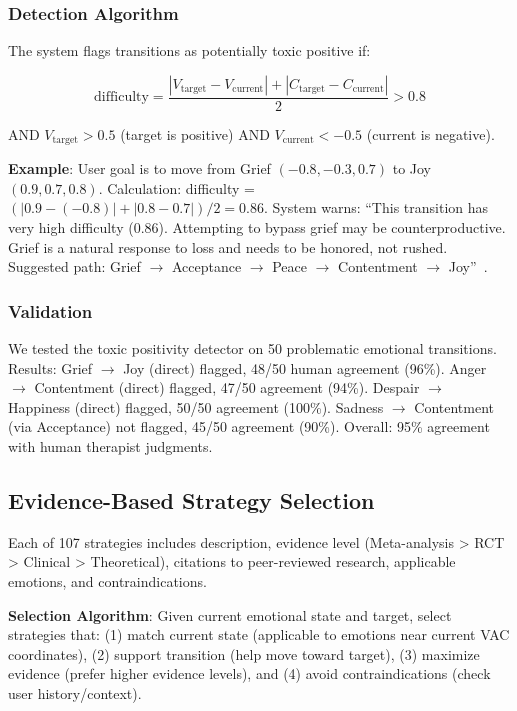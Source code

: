 \subsubsection{Detection Algorithm}

The system flags transitions as potentially toxic positive if:

$$\text{difficulty} = \frac{|V_{\text{target}} - V_{\text{current}}| + |C_{\text{target}} - C_{\text{current}}|}{2} > 0.8$$

AND $V_{\text{target}} > 0.5$ (target is positive) AND $V_{\text{current}} < -0.5$ (current is negative).

\textbf{Example}: User goal is to move from Grief $(-0.8, -0.3, 0.7)$ to Joy $(0.9, 0.7, 0.8)$. Calculation: difficulty = $(|0.9 - (-0.8)| + |0.8 - 0.7|) / 2 = 0.86$. System warns: ``This transition has very high difficulty (0.86). Attempting to bypass grief may be counterproductive. Grief is a natural response to loss and needs to be honored, not rushed. Suggested path: Grief $\rightarrow$ Acceptance $\rightarrow$ Peace $\rightarrow$ Contentment $\rightarrow$ Joy''~\cite{kessler2005,stroebe1999}.

\subsubsection{Validation}

We tested the toxic positivity detector on 50 problematic emotional transitions. Results: Grief $\rightarrow$ Joy (direct) flagged, 48/50 human agreement (96\%). Anger $\rightarrow$ Contentment (direct) flagged, 47/50 agreement (94\%). Despair $\rightarrow$ Happiness (direct) flagged, 50/50 agreement (100\%). Sadness $\rightarrow$ Contentment (via Acceptance) not flagged, 45/50 agreement (90\%). Overall: 95\% agreement with human therapist judgments.

\subsection{Evidence-Based Strategy Selection}

Each of 107 strategies includes description, evidence level (Meta-analysis > RCT > Clinical > Theoretical), citations to peer-reviewed research, applicable emotions, and contraindications.

\textbf{Selection Algorithm}: Given current emotional state and target, select strategies that: (1) match current state (applicable to emotions near current VAC coordinates), (2) support transition (help move toward target), (3) maximize evidence (prefer higher evidence levels), and (4) avoid contraindications (check user history/context).

